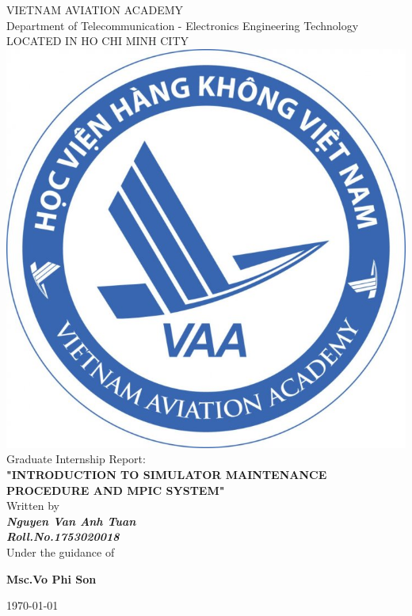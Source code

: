 \documentclass[a4paper,13pt]{report}
\begin{document}
    \newpage
    \centering
    \LARGE{\textsc{VIETNAM AVIATION ACADEMY}}\\
    \vspace{3mm}
    \normalsize{Department of Telecommunication - Electronics Engineering Technology} \\
    \vspace{3mm}
    \large{LOCATED IN HO CHI MINH CITY} \\
    \vspace{3mm}
    \includegraphics[scale=0.3]{img/logo.png} \\
    \vspace{3mm}
    \normalsize{Graduate Internship Report:} \\
    \vspace{15mm}
    \huge{\textbf{"INTRODUCTION TO SIMULATOR MAINTENANCE PROCEDURE AND MPIC SYSTEM"}} \\ 
    \vspace{20mm}
    \normalsize{Written by} \\ 
    \vspace{3mm}
    \large{\textbf{\textit{Nguyen Van Anh Tuan}}} \\ 
    \vspace{3mm}
    \large{\textbf{\textit{Roll.No.1753020018}}} \\ 
    \vspace{15mm}
    \large{Under the guidance of} \\
    \vspace{7mm}
    \centerline{\textbf{\large{Msc.Vo Phi Son}}} 
    \vspace{3cm}
    \centerline{\today}
    
\end{document}
